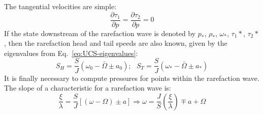 The tangential velocities are simple:
\begin{equation}
\label{eq:rarefaction-tangential-velocities}
\frac{{\partial {\tau _1}}}{{\partial p}} = \frac{{\partial {\tau _2}}}{{\partial p}} = 0
\end{equation}
If the state downstream of the rarefaction wave is denoted by $p_*$,  $\rho_*$, $\omega_*$, $\tau_1*$, $\tau_2*$, then the rarefaction head and tail speeds are also known, given by the eigenvalues from Eq.~\ref{eq:UCS-eigenvalues}:
\begin{equation}
\label{eq:rarefaction-wave-speeds}
{S_H} = \frac{S}{J}\left( {{\omega _0} - \bar \Omega  \pm {a_0}} \right);\,\,\,\,{S_T} = \frac{S}{J}\left( {{\omega _*} - \bar \Omega  \pm {a_*}} \right)
\end{equation}
It is finally necessary to compute pressures for points within the rarefaction wave. The slope of a characteristic for a rarefaction wave is:
\begin{equation}
\label{eq:rarefaction-characteristic-slope}
\frac{\xi }{\lambda } = \frac{S}{J}\left[ {\left( {\omega  - \Omega } \right) \pm a} \right] \Rightarrow \omega  = \frac{J}{S}\left( {\frac{\xi }{\lambda }} \right) \mp a + \Omega 
\end{equation}
